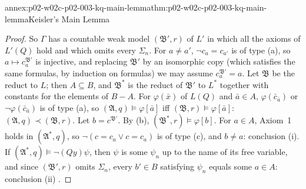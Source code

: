 \begin{annexitem}{annex:p02-w02c-p02-003-kq-main-lemma}{thm:p02-w02c-p02-003-kq-main-lemma}{Keisler's Main Lemma}
\begin{proof}
So \(\Gamma\) has a countable weak model \((\mathfrak B',r)\) of \(L'\) in
which all the axioms of \(L'(Q)\) hold and which omits every \(\Sigma_n\).
For \(a\neq a'\), \(\neg c_a=c_{a'}\) is of type (a), so \(a\mapsto
c_a^{\mathfrak B'}\) is injective, and replacing \(\mathfrak B'\) by an
isomorphic copy (which satisfies the same formulas, by induction on
formulas) we may assume \(c_a^{\mathfrak B'}=a\).  Let \(\mathfrak B\) be the
reduct to \(L\); then \(A\subseteq B\), and \(\mathfrak B^{*}\) is the
reduct of \(\mathfrak B'\) to \(L^{*}\) together with constants for the
elements of \(B-A\).  For \(\varphi(\bar x)\) of \(L(Q)\) and \(\bar a\in
A\), \(\varphi(\bar c_{\bar a})\) or \(\neg\varphi(\bar c_{\bar a})\) is of
type (a), so \((\mathfrak A,q)\models\varphi[\bar a]\) iff
\((\mathfrak B,r)\models\varphi[\bar a]\): \((\mathfrak A,q)\prec
(\mathfrak B,r)\).  Let \(b=c^{\mathfrak B'}\).  By (b),
\((\mathfrak B^{*},r)\models\varphi[b]\).  For \(a\in A\), Axiom~1 holds in
\((\mathfrak A^{*},q)\), so \(\neg(c=c_a\lor c=c_a)\) is of type (c), and
\(b\neq a\): conclusion (i).  If \((\mathfrak A^{*},q)\models\neg(Qy)\psi\),
then \(\psi\) is some \(\psi_n\) up to the name of its free variable, and
since \((\mathfrak B',r)\) omits \(\Sigma_n\), every \(b'\in B\) satisfying
\(\psi_n\) equals some \(a\in A\): conclusion (ii)
\cite[\S2, Lemma~2.7, pp.~19--23]{Keisler1970}.


\end{proof}
\end{annexitem}
